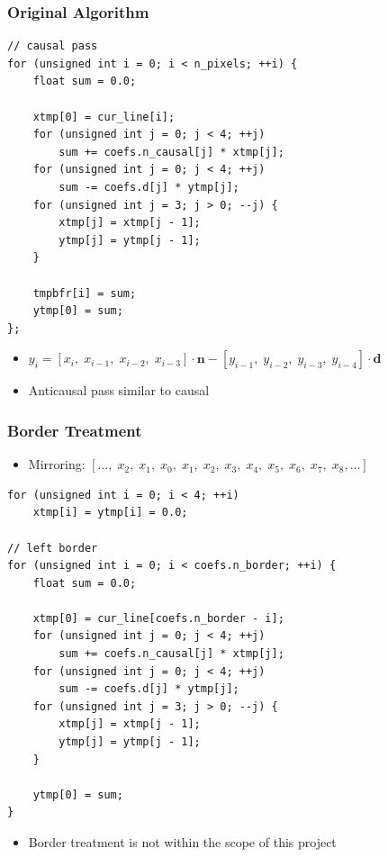 \documentclass{beamer}
\begin{document}
\begin{frame}[fragile]
\frametitle{Original Algorithm}
  \begin{lstlisting}[basicstyle=\tiny]
// causal pass
for (unsigned int i = 0; i < n_pixels; ++i) {
    float sum = 0.0;

    xtmp[0] = cur_line[i];
    for (unsigned int j = 0; j < 4; ++j)
        sum += coefs.n_causal[j] * xtmp[j];
    for (unsigned int j = 0; j < 4; ++j)
        sum -= coefs.d[j] * ytmp[j];
    for (unsigned int j = 3; j > 0; --j) {
        xtmp[j] = xtmp[j - 1];
        ytmp[j] = ytmp[j - 1];
    }

    tmpbfr[i] = sum;
    ytmp[0] = sum;
};
\end{lstlisting}
\begin{itemize}
  \item $y_i = [x_i,\;x_{i-1},\;x_{i-2},\;x_{i-3}]\cdot\mathbf{n}
  - [y_{i-1},\;y_{i-2},\;y_{i-3},\;y_{i-4}]\cdot\mathbf{d}$ 
  \item Anticausal pass similar to causal 
\end{itemize}
\end{frame}

\begin{frame}[fragile]
\frametitle{Border Treatment}

\begin{itemize}
  \item Mirroring: $[\ldots,\;x_{2},\;x_{1},\;x_0,\;x_{1},\;x_{2},\;x_{3},\;x_{4},\;x_{5},\;x_{6},\;x_{7},\;x_{8},\ldots]$
\end{itemize}
 \begin{lstlisting}[basicstyle=\tiny]
for (unsigned int i = 0; i < 4; ++i)
    xtmp[i] = ytmp[i] = 0.0;

// left border
for (unsigned int i = 0; i < coefs.n_border; ++i) {
    float sum = 0.0;

    xtmp[0] = cur_line[coefs.n_border - i];
    for (unsigned int j = 0; j < 4; ++j)
        sum += coefs.n_causal[j] * xtmp[j];
    for (unsigned int j = 0; j < 4; ++j)
        sum -= coefs.d[j] * ytmp[j];
    for (unsigned int j = 3; j > 0; --j) {
        xtmp[j] = xtmp[j - 1];
        ytmp[j] = ytmp[j - 1];
    }

    ytmp[0] = sum;
}
 \end{lstlisting}
 \begin{itemize}
  \item Border treatment is not within the scope of this project
\end{itemize}
\end{frame}
\end{document}
